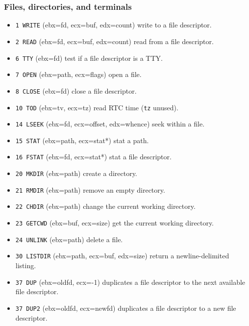 \documentclass[11pt,a4paper]{article}
\begin{document}
\subsubsection{Files, directories, and terminals}
\begin{itemize}
	\item \texttt{1 WRITE} (ebx=fd, ecx=buf, edx=count) write to a file descriptor.
	\item \texttt{2 READ} (ebx=fd, ecx=buf, edx=count) read from a file descriptor.
	\item \texttt{6 TTY} (ebx=fd) test if a file descriptor is a TTY.
	\item \texttt{7 OPEN} (ebx=path, ecx=flags) open a file.
	\item \texttt{8 CLOSE} (ebx=fd) close a file descriptor.
	\item \texttt{10 TOD} (ebx=tv, ecx=tz) read RTC time (\texttt{tz} unused).
	\item \texttt{14 LSEEK} (ebx=fd, ecx=offset, edx=whence) seek within a file.
	\item \texttt{15 STAT} (ebx=path, ecx=stat*) stat a path.
	\item \texttt{16 FSTAT} (ebx=fd, ecx=stat*) stat a file descriptor.
	\item \texttt{20 MKDIR} (ebx=path) create a directory.
	\item \texttt{21 RMDIR} (ebx=path) remove an empty directory.
	\item \texttt{22 CHDIR} (ebx=path) change the current working directory.
	\item \texttt{23 GETCWD} (ebx=buf, ecx=size) get the current working directory.
	\item \texttt{24 UNLINK} (ebx=path) delete a file.
	\item \texttt{30 LISTDIR} (ebx=path, ecx=buf, edx=size) return a newline-delimited listing.
	\item \texttt{37 DUP} (ebx=oldfd, ecx=-1) duplicates a file descriptor to the next available file descriptor.
	\item \texttt{37 DUP2} (ebx=oldfd, ecx=newfd) duplicates a file descriptor to a new file descriptor.
\end{itemize}
\end{document}
